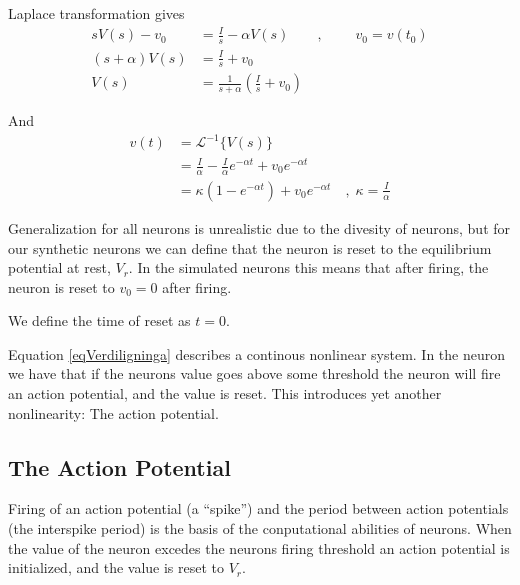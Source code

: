 Laplace transformation gives
\begin{equation}
	\begin{split}
		sV(s)-v_0 		&= \frac{I}{s} - \alpha V(s) 			\qquad, \; \qquad v_0 = v(t_0) 				\\
		(s+\alpha)V(s) 	&= \frac{I}{s} + v_0 														\\
		V(s) 			&= \frac{1}{s+\alpha}\left( \frac{I}{s} + v_0 \right)
	\end{split}
\end{equation}

And 
\begin{equation}
	\begin{split}
		\label{eqVerdiligninga}
		v(t)  	&= 		\mathscr{L}^{-1}\bigg\{ V(s) \bigg\}  									\\
		 		&=		\frac{I}{\alpha} - \frac{I}{\alpha} e^{-\alpha t} + v_0 e^{-\alpha t} 	\\
				&= 		\kappa \left( 1 - e^{-\alpha t} \right) + v_0 e^{-\alpha t} 	\quad,\; \kappa = \frac{I}{\alpha} 
	\end{split}
\end{equation}

Generalization for all neurons is unrealistic due to the divesity of neurons, but for our synthetic neurons we can define that the neuron is reset to the equilibrium potential at rest, $V_r$.
In the simulated neurons this means that after firing, the neuron is reset to $v_0=0$ after firing. 

We define the time of reset as $t=0$.

Equation \eqref{eqVerdiligninga} describes a continous nonlinear system. 
In the neuron we have that if the neurons value goes above some threshold the neuron will fire an action potential, and the value is reset. This introduces yet another nonlinearity: 
The action potential.

\subsection{The Action Potential}
Firing of an action potential (a ``spike'') and the period between action potentials (the interspike period) is the basis of the conputational abilities of neurons.
When the value of the neuron excedes the neurons firing threshold an action potential is initialized, and the value is reset to $V_{r}$.


